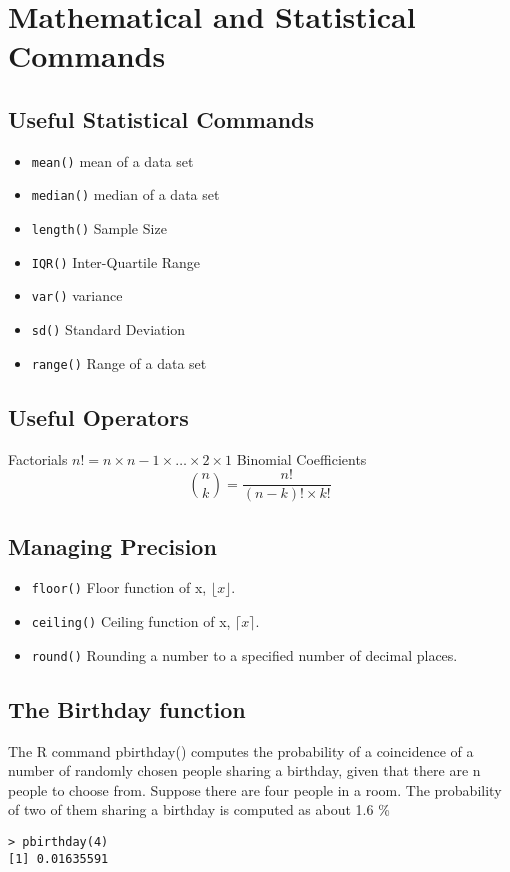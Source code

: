 \documentclass[a4paper,12pt]{article}
\begin{document}
\tableofcontents
\newpage
\section{Mathematical and Statistical Commands}

\subsection{Useful Statistical Commands}
\begin{itemize}
\item \texttt{mean()} mean of a data set
\item \texttt{median()} median of a data set
\item \texttt{length()} Sample Size
\item \texttt{IQR()} Inter-Quartile Range
\item \texttt{var()} variance
\item \texttt{sd()} Standard Deviation
\item \texttt{range()} Range of a data set
\end{itemize}

\subsection{Useful Operators}

Factorials
$n! = n \times n-1 \times \ldots \times 2 \times 1 $
Binomial Coefficients
\[ { n \choose k }  = \frac{n!}{(n-k)! \times k!}\]
\subsection{Managing Precision}

\begin{itemize}
\item \texttt{floor()} Floor function of x, $\lfloor x \rfloor$.
\item \texttt{ceiling()} Ceiling function of x, $\lceil x \rceil$.
\item \texttt{round()} Rounding a number to a specified number of decimal places.
\end{itemize}
\subsection{The Birthday function}
The R command pbirthday() computes the probability of a coincidence of a number of randomly chosen people sharing a birthday, given that there are n people to choose from.
Suppose there are four people in a room. The probability of two of them sharing a birthday is computed as about 1.6 \%
\begin{verbatim}
> pbirthday(4)
[1] 0.01635591
\end{verbatim}
\end{document}
